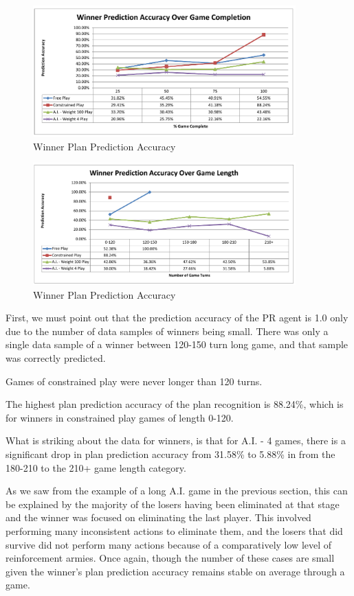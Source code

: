 \documentclass[parskip]{cs4rep}
\begin{document}
\begin{figure}[h]
\centerline{
\includegraphics[width=0.9\textwidth]{images/winner-game-complete.pdf}
}
\caption{Winner Plan Prediction Accuracy}
\label{fig:winner-pred-accuracy}
\end{figure}
\begin{figure}[h]
\centerline{
\includegraphics[width=0.9\textwidth]{images/winner-game-length.pdf}
}
\caption{Winner Plan Prediction Accuracy}
\label{fig:win-plan-pred}
\end{figure}

First, we must point out that the prediction accuracy of the PR agent is 1.0 only due to the number of data samples of winners being small. There was only a single data sample of a winner between 120-150 turn long game, and that sample was correctly predicted.

Games of constrained play were never longer than 120 turns.

The highest plan prediction accuracy of the plan recognition is 88.24\%, which is for winners in constrained play games of length 0-120.

What is striking about the data for winners, is that for A.I. - 4 games, there is a significant drop in plan prediction accuracy from 31.58\% to 5.88\% in from the 180-210 to the 210+ game length category.

As we saw from the example of a long A.I. game in the previous section, this can be explained by the majority of the losers having been eliminated at that stage and the winner was focused on eliminating the last player. This involved performing many inconsistent actions to eliminate them, and the losers that did survive did not perform many actions because of a comparatively low level of reinforcement armies. Once again, though the number of these cases are small given the winner’s plan prediction accuracy remains stable on average through a game.
\end{document}
